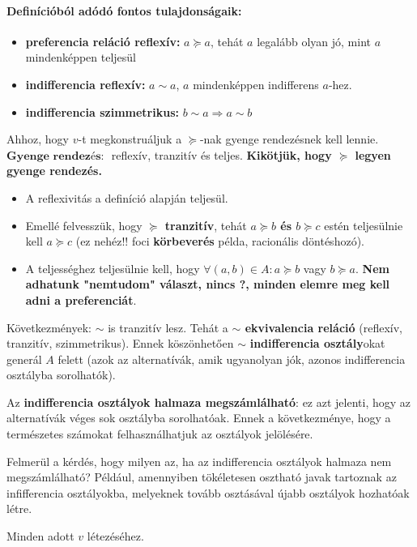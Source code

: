 \documentclass[a4paper,12pt]{article}
\begin{document}
\paragraph{Definícióból adódó fontos tulajdonságaik:}

\begin{itemize}
\item \textbf{preferencia reláció reflexív: } $a \succeq a $, tehát $a$ legalább olyan jó, mint $a$ mindenképpen teljesül 
\item \textbf{indifferencia reflexív:} $a \sim a $, $a$ mindenképpen indifferens $a$-hez.
\item \textbf{indifferencia szimmetrikus:}  $b \sim a \Rightarrow a \sim b$  
\end{itemize}

Ahhoz, hogy $v$-t megkonstruáljuk a $\succeq$-nak gyenge rendezésnek kell lennie. $\textbf{Gyenge rendezés: }$  reflexív, tranzitív és teljes. \textbf{Kikötjük, hogy $\succeq$ legyen gyenge rendezés.}
\begin{itemize}
\item A reflexivitás a definíció alapján teljesül. 
\item Emellé felvesszük, hogy \textbf{$\succeq$ tranzitív}, tehát \textbf{$a \succeq b$ és $b \succeq c$} estén teljesülnie kell \textbf{$a \succeq c$} (ez nehéz!! foci \textbf{körbeverés} példa, racionális döntéshozó). 
\item A teljességhez teljesülnie kell, hogy $\forall (a,b) \in A: a \succeq b$ vagy $b \succeq a$. \textbf{Nem adhatunk "nemtudom" választ, nincs ?, minden elemre meg kell adni a preferenciát}.  
\end{itemize}
Következmények:  $\sim$ is tranzitív lesz. Tehát a \textbf{$\sim$ ekvivalencia reláció} (reflexív, tranzitív, szimmetrikus). Ennek köszönhetően $\sim$ \textbf{indifferencia osztály}okat generál $A$ felett (azok az alternatívák, amik ugyanolyan jók, azonos indifferencia osztályba sorolhatók).

Az \textbf{indifferencia osztályok halmaza megszámlálható}: ez azt jelenti, hogy az alternatívák véges sok osztályba sorolhatóak. Ennek a következménye, hogy a természetes számokat felhasználhatjuk az osztályok jelölésére.

Felmerül a kérdés, hogy milyen az, ha az indifferencia osztályok halmaza nem megszámlálható?
Például, amennyiben tökéletesen osztható javak tartoznak az infifferencia osztályokba, melyeknek tovább osztásával újabb osztályok hozhatóak létre.

Minden adott $v$ létezéséhez.
\end{document}

